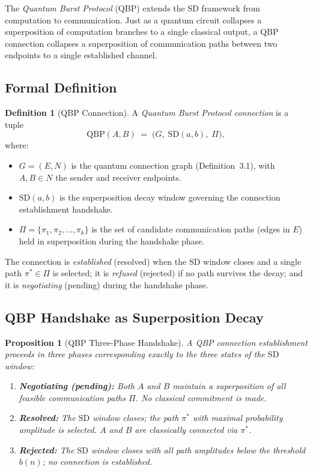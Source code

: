 \documentclass[12pt, a4paper]{article}
\theoremstyle{plain}
\newtheorem{proposition}[theorem]{Proposition}
\theoremstyle{definition}
\newtheorem{definition}[theorem]{Definition}
\theoremstyle{remark}
\newcommand{\SD}{\ensuremath{\mathrm{SD}}}   %
\begin{document}
The \emph{Quantum Burst Protocol} (QBP) extends the \SD{} framework from
computation to communication.  Just as a quantum circuit collapses a
superposition of computation branches to a single classical output, a QBP
connection collapses a superposition of communication paths between two
endpoints to a single established channel.

\subsection{Formal Definition}

\begin{definition}[QBP Connection]
  A \emph{Quantum Burst Protocol connection} is a tuple
  \[
    \mathrm{QBP}(A, B) \;=\; \bigl(G,\; \SD(a,b),\; \Pi \bigr),
  \]
  where:
  \begin{itemize}
    \item $G = (E, N)$ is the quantum connection graph (Definition~3.1),
          with $A, B \in N$ the sender and receiver endpoints.
    \item $\SD(a,b)$ is the superposition decay window governing the
          connection establishment handshake.
    \item $\Pi = \{\pi_1, \pi_2, \ldots, \pi_k\}$ is the set of candidate
          communication paths (edges in $E$) held in superposition during
          the handshake phase.
  \end{itemize}
  The connection is \emph{established} (resolved) when the \SD{} window
  closes and a single path $\pi^* \in \Pi$ is selected; it is
  \emph{refused} (rejected) if no path survives the decay; and it is
  \emph{negotiating} (pending) during the handshake phase.
\end{definition}

\subsection{QBP Handshake as Superposition Decay}

\begin{proposition}[QBP Three-Phase Handshake]
  A QBP connection establishment proceeds in three phases corresponding
  exactly to the three states of the \SD{} window:
  \begin{enumerate}
    \item \textbf{Negotiating (pending):}  Both $A$ and $B$ maintain a
          superposition of all feasible communication paths $\Pi$.  No
          classical commitment is made.
    \item \textbf{Resolved:}  The \SD{} window closes; the path $\pi^*$
          with maximal probability amplitude is selected.  $A$ and $B$
          are classically connected via $\pi^*$.
    \item \textbf{Rejected:}  The \SD{} window closes with all path
          amplitudes below the threshold $b(n)$; no connection is established.
  \end{enumerate}
\end{proposition}
\end{document}
